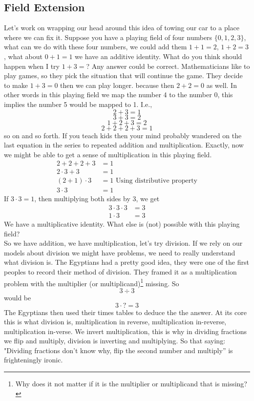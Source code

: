 \documentclass[12pt]{article}
\begin{document}
\subsection*{Field Extension}
Let's work on wrapping our head around this idea of towing our car to a place where we can fix it.  Suppose you have a playing field of four numbers $\{0, 1, 2, 3\}$, what can we do with these four numbers, we could add them $1+1=2$, $1+2=3$, what about $0+1=1$  we have an additive identity.  What do you think should happen when I try $1+3=$?  Any answer could be correct.  Mathematicians like to play games, so they pick the situation that will continue the game.  They decide to make $1+3=0$ then we can play longer. because then $2+2=0$ as well.  In other words in this playing field we map the number 4 to the number 0, this implies the number 5 would be mapped to 1.  I.e., $$2+3=1$$ $$3+3=2$$ $$1+2+3=2$$ $$2+2+2+3=1$$ so on and so forth.  If you teach kids then your mind probably wandered on the last equation in the series to repeated addition and multiplication.  Exactly, now we might be able to get a sense of multiplication in this playing field.
\begin{align*}
2+2+2+3 &=1 \\
2 \cdot 3 +3 &= 1 \\
(2+1) \cdot 3 &= 1 \text{ Using distributive property} \\
3 \cdot 3 &= 1
\end{align*}
If $3 \cdot 3 = 1$, then multiplying both sides by 3, we get
\begin{align*}
3 \cdot 3 \cdot 3 &= 3 \\
1 \cdot 3 &= 3
\end{align*}
We have a multiplicative identity.  What else is (not) possible with this playing field?\\

So we have addition, we have multiplication, let's try division.  If we rely on our models about division we might have problems, we need to really understand what division is.  The Egyptians had a pretty good idea, they were one of the first peoples to record their method of division.  They framed it as a multiplication problem with the multiplier (or multiplicand)\footnote{Why does it not matter if it is the multiplier or multiplicand that is missing?} missing. So $$3 \div 3$$ would be $$3 \cdot ? = 3$$  
The Egyptians then used their times tables to deduce the the answer.  At its core this is what division is, multiplication in reverse, multiplication in-reverse, multiplication in-verse.  We invert multiplication, this is why in dividing fractions we flip and multiply, division is inverting and multiplying.  So that saying: "Dividing fractions don't know why, flip the second number and multiply'' is frighteningly ironic.\\
\end{document}
